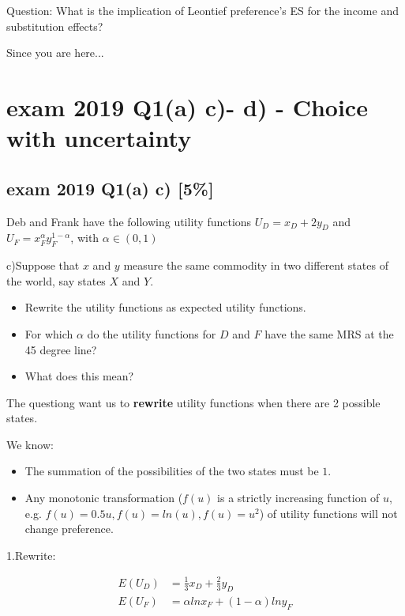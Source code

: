 \documentclass{article}
\begin{document}
\begin{mdframed}[backgroundcolor=blue!20,linecolor=white]
Question: What is the implication of Leontief preference's ES for the income and substitution effects? 
\end{mdframed}

\newpage

Since you are here...
\section{exam 2019 Q1(a) c)- d) - Choice with uncertainty}

\subsection{exam 2019 Q1(a) c) [5\%] }

Deb and Frank have the following utility functions
$U_D = x_D + 2y_D$ and $U_F = x^\alpha_Fy^{1-\alpha}_F$, with $\alpha \in (0,1)$

c)Suppose that $x$ and $y$ measure the same commodity in two
different states of the world, say states $X$ and $Y$. 

\begin{itemize}
\item Rewrite the utility functions as expected utility functions. 
\item For which $\alpha$ do the utility functions for $D$ and $F$ have the same MRS at the 45 degree line?
\item What does this mean?
\end{itemize}

\begin{mdframed}[backgroundcolor=blue!20,linecolor=white]

The questiong want us to \textbf{rewrite} utility functions when there are 2 possible states. 

We know:
\begin{itemize}
\item The summation of the possibilities of the two states must be $1$.
\item Any monotonic transformation ($f(u)$ is a strictly increasing function of $u$, e.g. $f(u) = 0.5 u, f(u) = ln(u), f(u)=u^2 $) of utility functions will not change preference.
\end{itemize}
\end{mdframed}

1.Rewrite:

\begin{align*}
E(U_D) &= \frac{1}{3}x_D + \frac{2}{3}y_D \\
E(U_F) &= \alpha ln x_F +  ({1-\alpha}) ln y_F 
\end{align*}
\end{document}
